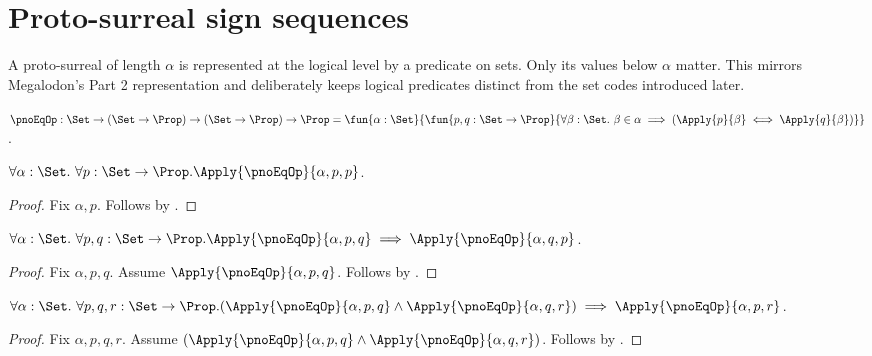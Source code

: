 


\section{Proto-surreal sign sequences}

A proto-surreal of length $\alpha$ is represented at the logical level by a
predicate on sets.  Only its values below $\alpha$ matter.  This mirrors
Megalodon's Part 2 representation and deliberately keeps logical predicates
distinct from the set codes introduced later.

\begin{definition}\label{pno_eq}
    $\pnoEqOp :
        \Set\to(\Set\to\Prop)\to(\Set\to\Prop)\to\Prop
        =\fun{\alpha:\Set}{
            \fun{p,q:\Set\to\Prop}{
                \forall \beta:\Set.\ \beta\in\alpha\implies
                    (\Apply{p}{\beta}\iff\Apply{q}{\beta})}}$.
\end{definition}

\begin{proposition}\label{pno_eq_reflexive}
    $\forall \alpha:\Set.\ \forall p:\Set\to\Prop.
        \Apply{\pnoEqOp}{\alpha,p,p}$.
\end{proposition}
\begin{proof}
    Fix $\alpha,p$.
    Follows by .
\end{proof}

\begin{proposition}\label{pno_eq_symmetric}
    $\forall \alpha:\Set.\ \forall p,q:\Set\to\Prop.
        \Apply{\pnoEqOp}{\alpha,p,q}\implies
        \Apply{\pnoEqOp}{\alpha,q,p}$.
\end{proposition}
\begin{proof}
    Fix $\alpha,p,q$.
    Assume $\Apply{\pnoEqOp}{\alpha,p,q}$.
    Follows by .
\end{proof}

\begin{proposition}\label{pno_eq_transitive}
    $\forall \alpha:\Set.\ \forall p,q,r:\Set\to\Prop.
        (\Apply{\pnoEqOp}{\alpha,p,q}\land
         \Apply{\pnoEqOp}{\alpha,q,r})
            \implies
         \Apply{\pnoEqOp}{\alpha,p,r}$.
\end{proposition}
\begin{proof}
    Fix $\alpha,p,q,r$.
    Assume $(\Apply{\pnoEqOp}{\alpha,p,q}\land
        \Apply{\pnoEqOp}{\alpha,q,r})$.
    Follows by .
\end{proof}

